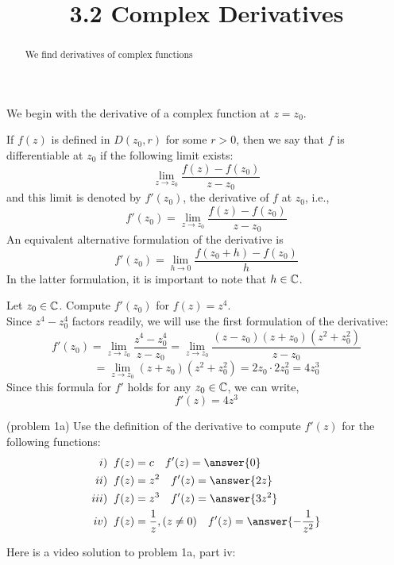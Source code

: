 \documentclass[handout]{ximera}
\title{3.2 Complex Derivatives}
\begin{document}
\begin{abstract}
We find derivatives of complex functions
\end{abstract}

\maketitle



We begin with the derivative of a complex function at $z = z_0$.

\begin{definition}
If $f(z)$ is defined in $D(z_0, r)$ for some $r>0$, then we say that $f$ is differentiable at $z_0$ if the following limit exists:
\[
\lim_{z \to z_0} \frac{f(z) - f(z_0)}{z-z_0}
\]
and this limit is denoted by $f'(z_0)$, the derivative of $f$ at $z_0$, i.e., 
\[
f'(z_0) = \lim_{z \to z_0} \frac{f(z) - f(z_0)}{z-z_0}
\]
An equivalent alternative formulation of the derivative is 
\[
f'(z_0) = \lim_{h \to 0} \frac{f(z_0 +h) -f(z_0)}{h}
\]
In the latter formulation, it is important to note that $h\in  \mathbb C$.
\end{definition}

\begin{example}[example 1]
Let $z_0 \in \mathbb C$. Compute $f'(z_0)$ for $f(z) = z^4$.\\
Since $z^4 - z_0^4$ factors readily, we will use the first formulation of the derivative:
\[
f'(z_0) =\lim_{z \to z_0} \frac{z^4 - z_0^4}{z-z_0} =\lim_{z \to z_0} \frac{(z-z_0)(z+z_0)(z^2+z_0^2)}{z-z_0}
\]
\[
= \lim_{z \to z_0} (z+z_0)(z^2+z_0^2) = 2z_0\cdot 2z_0^2 = 4z_0^3
\]
Since this formula for $f'$ holds for any $z_0 \in \mathbb C$, we can write,
\[
f'(z) = 4z^3
\]
\end{example}


\begin{problem}(problem 1a)
Use the definition of the derivative to compute $f'(z)$ for the following functions:
\begin{align*}
i) \;\; &f(z) = c \quad f'(z) =\answer{0}\\
ii) \;\; &f(z) = z^2 \quad f'(z) =\answer{2z}\\
iii) \;\; &f(z) = z^3 \quad f'(z) =\answer{3z^2}\\
iv) \;\; & f(z) = \frac{1}{z}, (z \neq 0) \quad f'(z) =\answer{-\frac{1}{z^2}}
\end{align*}
\end{problem}

Here is a video solution to problem 1a, part iv:\\
\begin{foldable}
\end{foldable}
\end{document}
